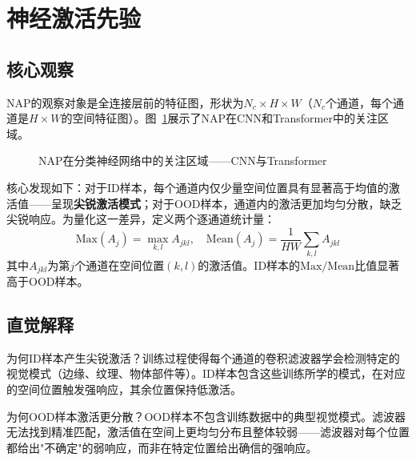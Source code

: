 \section{神经激活先验}

\subsection{核心观察}

NAP的观察对象是全连接层前的特征图，形状为$N_c \times H \times W$（$N_c$个通道，每个通道是$H \times W$的空间特征图）。图~\ref{fig:nap-position}展示了NAP在CNN和Transformer中的关注区域。

\begin{figure}[htb]
  \centering
  \caption{NAP在分类神经网络中的关注区域——CNN与Transformer}
  \label{fig:nap-position}
\end{figure}

核心发现如下：对于ID样本，每个通道内仅少量空间位置具有显著高于均值的激活值——呈现\textbf{尖锐激活模式}；对于OOD样本，通道内的激活更加均匀分散，缺乏尖锐响应。为量化这一差异，定义两个逐通道统计量：
\begin{equation}\label{eq:nap-stats}
  \text{Max}(A_j) = \max_{k,l} A_{jkl}, \quad \text{Mean}(A_j) = \frac{1}{HW}\sum_{k,l} A_{jkl}
\end{equation}
其中$A_{jkl}$为第$j$个通道在空间位置$(k,l)$的激活值。ID样本的$\text{Max}/\text{Mean}$比值显著高于OOD样本。

\subsection{直觉解释}

为何ID样本产生尖锐激活？训练过程使得每个通道的卷积滤波器学会检测特定的视觉模式\cite{zeiler2014visualizing, yosinski2015understanding_visual}（边缘、纹理、物体部件等）。ID样本包含这些训练所学的模式，在对应的空间位置触发强响应，其余位置保持低激活。

为何OOD样本激活更分散？OOD样本不包含训练数据中的典型视觉模式。滤波器无法找到精准匹配，激活值在空间上更均匀分布且整体较弱——滤波器对每个位置都给出"不确定"的弱响应，而非在特定位置给出确信的强响应。

